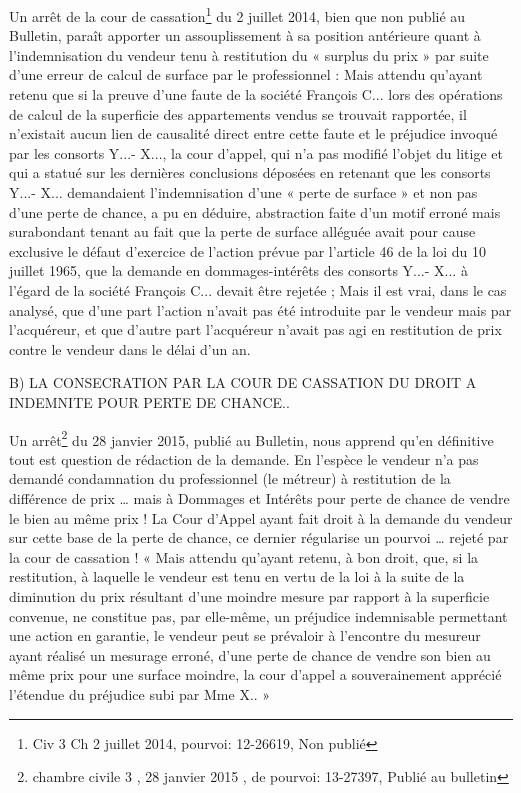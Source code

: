 			Un arrêt de la cour de cassation\footnote{Civ 3\ieme{} Ch 2 juillet 2014, pourvoi: 12-26619, Non publié} du 2 juillet 2014, bien que non publié au Bulletin, paraît apporter
			un assouplissement à sa position antérieure quant à l’indemnisation du vendeur tenu à restitution
			du « surplus du prix » par suite d’une erreur de calcul de surface par le professionnel :
			Mais attendu qu'ayant retenu que si la preuve d'une faute de la société François C... lors des opérations
			de calcul de la superficie des appartements vendus se trouvait rapportée, il n'existait aucun lien de
			causalité direct entre cette faute et le préjudice invoqué par les consorts Y...- X..., la cour d'appel, qui n'a
			pas modifié l'objet du litige et qui a statué sur les dernières conclusions déposées en retenant que les
			consorts Y...- X... demandaient l'indemnisation d'une « perte de surface » et non pas d'une perte de
			chance, a pu en déduire, abstraction faite d'un motif erroné mais surabondant tenant au fait que la perte
			de surface alléguée avait pour cause exclusive le défaut d'exercice de l'action prévue par l'article 46 de
			la loi du 10 juillet 1965, que la demande en dommages-intérêts des consorts Y...- X... à l'égard de la
			société François C... devait être rejetée ;
			Mais il est vrai, dans le cas analysé, que d’une part l’action n’avait pas été introduite par le vendeur mais
			par l’acquéreur, et que d’autre part l’acquéreur n’avait pas agi en restitution de prix contre le vendeur
			dans le délai d’un an.
			
			B) LA CONSECRATION PAR LA COUR DE CASSATION DU DROIT A INDEMNITE POUR PERTE DE
			CHANCE..
			
			Un arrêt\footnote{chambre civile 3 , 28 janvier 2015 , \no de pourvoi: 13-27397, Publié au bulletin} du 28 janvier 2015, publié au Bulletin, nous apprend qu’en définitive tout est question de
			rédaction de la demande.
			En l’espèce le vendeur n’a pas demandé condamnation du professionnel (le métreur) à restitution de la
			différence de prix … mais à Dommages et Intérêts pour perte de chance de vendre le bien au même prix !
			La Cour d’Appel ayant fait droit à la demande du vendeur sur cette base de la perte de chance, ce dernier
			régularise un pourvoi … rejeté par la cour de cassation !
			« Mais attendu qu'ayant retenu, à bon droit, que, si la restitution, à laquelle le vendeur est tenu en
			vertu de la loi à la suite de la diminution du prix résultant d'une moindre mesure par rapport à la
			superficie convenue, ne constitue pas, par elle-même, un préjudice indemnisable permettant une
			action en garantie, le vendeur peut se prévaloir à l'encontre du mesureur ayant réalisé un mesurage
			erroné, d'une perte de chance de vendre son bien au même prix pour une surface moindre, la cour
			d'appel a souverainement apprécié l'étendue du préjudice subi par Mme X.. »
			
